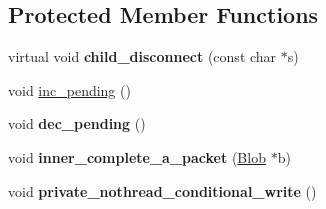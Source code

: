 \subsection*{Protected Member Functions}
\begin{DoxyCompactItemize}
\item 
virtual void {\bfseries child\+\_\+disconnect} (const char $\ast$s)\hypertarget{classVsnetTCPSocket_aa6965be8d78c871252020ba6b49d3ae8}{}\label{classVsnetTCPSocket_aa6965be8d78c871252020ba6b49d3ae8}

\item 
void \hyperlink{classVsnetTCPSocket_a4371db1339cfc53e1d7d22ef9e000587}{inc\+\_\+pending} ()
\item 
void {\bfseries dec\+\_\+pending} ()\hypertarget{classVsnetTCPSocket_ab9bd951ebf385d29c5afd9fc23b83dc9}{}\label{classVsnetTCPSocket_ab9bd951ebf385d29c5afd9fc23b83dc9}

\item 
void {\bfseries inner\+\_\+complete\+\_\+a\+\_\+packet} (\hyperlink{structVsnetTCPSocket_1_1Blob}{Blob} $\ast$b)\hypertarget{classVsnetTCPSocket_a936ba89c07c3c220dce6b646916371f2}{}\label{classVsnetTCPSocket_a936ba89c07c3c220dce6b646916371f2}

\item 
void {\bfseries private\+\_\+nothread\+\_\+conditional\+\_\+write} ()\hypertarget{classVsnetTCPSocket_ad08fecb101786bd92830572253ef3374}{}\label{classVsnetTCPSocket_ad08fecb101786bd92830572253ef3374}

\end{DoxyCompactItemize}
